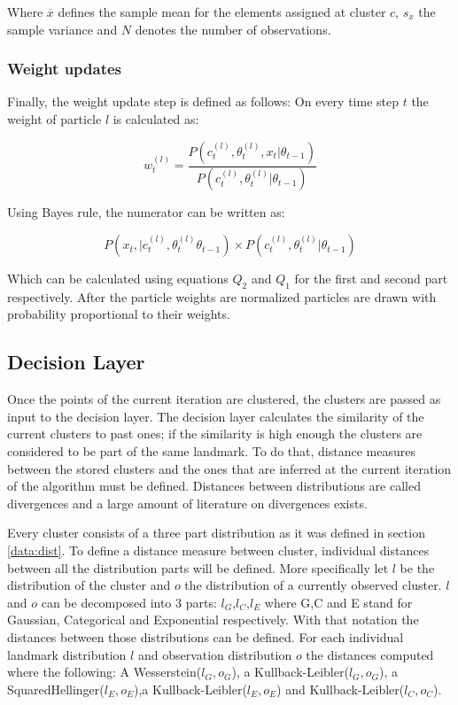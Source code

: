 \documentclass[twoside,hidelinks]{article}
\begin{document}
Where $\overline{x}$ defines the sample mean for the elements assigned at cluster $c$, $s_{x}$ the sample variance and $N$ denotes the number of observations\cite{conjugate}.

\subsubsection{Weight updates}

Finally, the weight update step is defined as follows: On every time step $t$ the weight of particle $l$ is calculated as:

\begin{equation}
w_t^{(l)} = \frac {P(c_t^{(l)} , \theta_t^{(l)}, x_t| 	\theta_{t-1} )}{P(c_t^{(l)} , \theta_t^{(l)}| 	\theta_{t-1} )}
\end{equation}

Using Bayes rule, the numerator can be written as:

\begin{equation}
	P(x_t , | c_t^{(l)} , \theta_t^{(l)} \theta_{t-1} ) \times P(c_t^{(l)} , \theta_t^{(l)}|  \theta_{t-1} )
\end{equation}

Which can be calculated using equations $Q_2$ and $Q_1$ for the first and second part respectively. After the particle weights are normalized particles are drawn with probability proportional to their weights.

\subsection{Decision Layer}

Once the points of the current iteration are clustered, the clusters are passed as input to the decision layer. The decision layer calculates the similarity of the current clusters to past ones; if the similarity is high enough the clusters are considered to be part of the same landmark. To do that, distance measures between the stored clusters and the ones that are inferred at the current iteration of the algorithm must be defined. Distances between distributions are called divergences and a large amount of literature on divergences exists.

Every cluster consists of a three part distribution as it was defined in section \ref{data:dist}. To define a distance measure between cluster, individual distances between all the distribution parts will be defined. More specifically let $l$ be the distribution of the cluster and $o$ the distribution of a currently observed cluster. $l$ and $o$ can be decomposed into 3 parts: $l_G$,$l_C$,$l_E$ where G,C and E stand for Gaussian, Categorical and Exponential respectively. With that notation the distances between those distributions can be defined. For each individual landmark distribution $l$ and observation distribution $o$ the distances computed where the following: A Wesserstein($l_G,o_G$), a Kullback-Leibler($l_G,o_G$), a SquaredHellinger($l_E,o_E$),a Kullback-Leibler($l_E,o_E$) and  Kullback-Leibler($l_C,o_C$).
\end{document}
